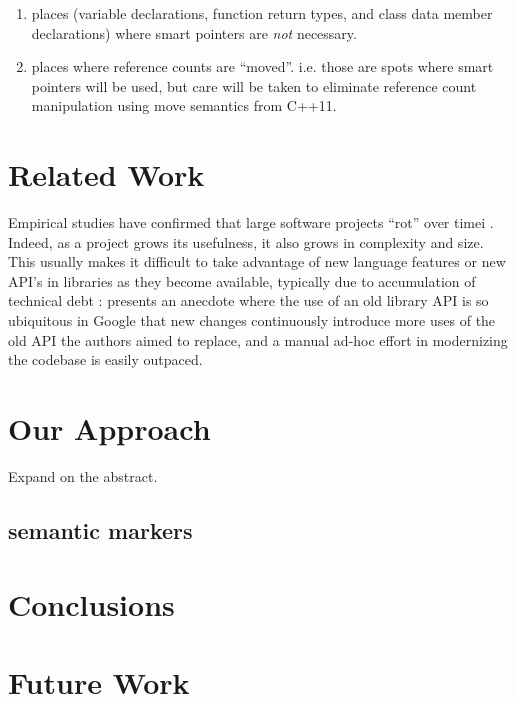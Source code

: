 \documentclass[sigplan,anonymous,review]{acmart}
\begin{document}
\begin{enumerate}
	\item places (variable declarations, function return types, and class data member declarations) where smart pointers are \emph{not} necessary.
	\item places where reference counts are ``moved''. i.e. those are spots where smart pointers will be used, but care will be taken to eliminate reference count manipulation using move semantics \cite{HinnantMove} from C++11.
\end{enumerate}


\section{Related Work}

Empirical studies have confirmed that large software projects ``rot'' over timei \cite{EickCodeDecay}.
Indeed, as a project grows its usefulness, it also grows in complexity and size.
This usually makes it difficult to take advantage of new language features or new API's in libraries as they become available, typically due to accumulation of technical debt \cite{KlingerTechDebt}:
\cite{WrightClangMR} presents an anecdote where the use of an old library API is so ubiquitous in Google that new changes continuously introduce more uses of the old API the authors aimed to replace,
and a manual ad-hoc effort in modernizing the codebase is easily outpaced.

\section{Our Approach}
Expand on the abstract.

\subsection{semantic markers}

\section{Conclusions}

\section{Future Work}



\end{document}
